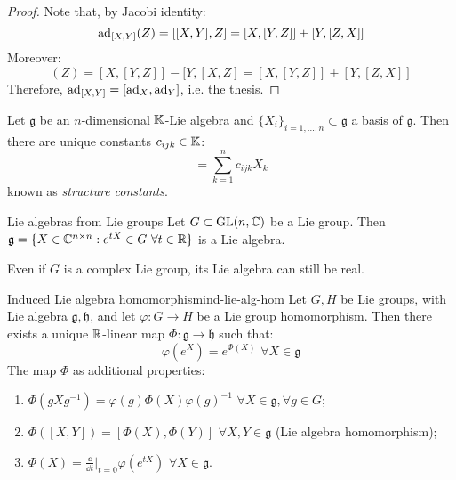 \begin{proofbox}
  \begin{proof}
    Note that, by Jacobi identity:
    \begin{equation*}
      \operatorname{ad}_{[X,Y]}(Z) = [[X,Y],Z] = [X,[Y,Z]] + [Y,[Z,X]]
    \end{equation*}
    Moreover:
    \begin{equation*}
      [\ad_X,\ad_Y](Z) = [X,[Y,Z]] - [Y,[X,Z] = [X,[Y,Z]] + [Y,[Z,X]]
    \end{equation*}
    Therefore, $ \operatorname{ad}_{[X,Y]} = [\operatorname{ad}_X,\operatorname{ad}_Y] $, i.e. the thesis.
  \end{proof}
\end{proofbox}

Let $ \mathfrak{g} $ be an $ n $-dimensional $ \mathbb{K} $-Lie algebra and $ \{X_i\}_{i = 1,\dots,n} \subset \mathfrak{g} $ a basis of $ \mathfrak{g} $. Then there are unique constants $ c_{ijk} \in \mathbb{K} $:
\begin{equation*}
  [X_i , X_j] = \sum_{k = 1}^{n} c_{ijk} X_k
\end{equation*}
known as \textit{structure constants}.

\begin{theorem}{Lie algebras from Lie groups}{}
  Let $ G \subset \mathrm{GL}(n,\mathbb{C}) $ be a Lie group. Then $ \mathfrak{g} = \{X \in \mathbb{C}^{n \times n} : e^{t X} \in G \,\,\forall t \in \mathbb{R} \} $ is a Lie algebra.
\end{theorem}

Even if $ G $ is a complex Lie group, its Lie algebra can still be real.

\begin{theorem}{Induced Lie algebra homomorphism}{ind-lie-alg-hom}
  Let $ G,H $ be Lie groups, with Lie algebra $ \mathfrak{g},\mathfrak{h} $, and let $ \varphi : G \rightarrow H $ be a Lie group homomorphism. Then there exists a unique $ \mathbb{R} $-linear map $ \Phi : \mathfrak{g} \rightarrow \mathfrak{h} $ such that:
  \begin{equation*}
    \varphi(e^X) = e^{\Phi(X)} \,\,\forall X \in \mathfrak{g}
  \end{equation*}
  The map $ \Phi $ as additional properties:
  \begin{enumerate}
    \item $ \Phi(gXg^{-1}) = \varphi(g) \Phi(X) \varphi(g)^{-1} \,\,\forall X \in \mathfrak{g} , \forall g \in G $;
    \item $ \Phi([X,Y]) = [\Phi(X),\Phi(Y)] \,\,\forall X,Y \in \mathfrak{g} $ (Lie algebra homomorphism);
    \item $ \Phi(X) = \frac{\dd}{\dd t}\big\vert_{t = 0} \varphi(e^{tX}) \,\,\forall X \in \mathfrak{g} $.
  \end{enumerate}
\end{theorem}

